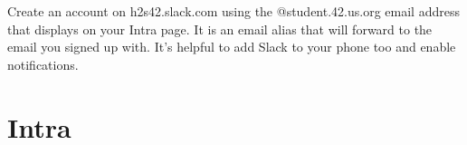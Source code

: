 \documentclass{42-en}
\begin{document}
Create an account on h2s42.slack.com using the @student.42.us.org email address that displays on your Intra page. It is an email alias that will forward to the email you signed up with. It's helpful to add Slack to your phone too and enable notifications.




\chapter{Intra}
\end{document}
